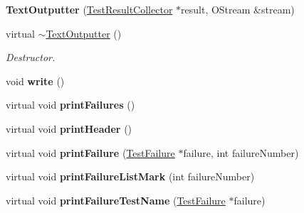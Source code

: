 \begin{DoxyCompactItemize}
\item 
\hypertarget{class_text_outputter_acd0d43125aaa9a929399fc9175633c78}{{\bfseries Text\+Outputter} (\hyperlink{class_test_result_collector}{Test\+Result\+Collector} $\ast$result, O\+Stream \&stream)}\label{class_text_outputter_acd0d43125aaa9a929399fc9175633c78}

\item 
\hypertarget{class_text_outputter_a835773bfd9dd781c3584886b37b30f92}{virtual \hyperlink{class_text_outputter_a835773bfd9dd781c3584886b37b30f92}{$\sim$\+Text\+Outputter} ()}\label{class_text_outputter_a835773bfd9dd781c3584886b37b30f92}

\begin{DoxyCompactList}\small\item\em Destructor. \end{DoxyCompactList}\item 
\hypertarget{class_text_outputter_a6b52425e9d17a04f04fc42a88b564176}{void {\bfseries write} ()}\label{class_text_outputter_a6b52425e9d17a04f04fc42a88b564176}

\item 
\hypertarget{class_text_outputter_aef9e8da525dc37c91e05ba9c51569260}{virtual void {\bfseries print\+Failures} ()}\label{class_text_outputter_aef9e8da525dc37c91e05ba9c51569260}

\item 
\hypertarget{class_text_outputter_ab14d6e5f16e1bdc995061ab5137d3671}{virtual void {\bfseries print\+Header} ()}\label{class_text_outputter_ab14d6e5f16e1bdc995061ab5137d3671}

\item 
\hypertarget{class_text_outputter_a943eb42337d075c43e1910092903cfbc}{virtual void {\bfseries print\+Failure} (\hyperlink{class_test_failure}{Test\+Failure} $\ast$failure, int failure\+Number)}\label{class_text_outputter_a943eb42337d075c43e1910092903cfbc}

\item 
\hypertarget{class_text_outputter_a347fd525f3318b45c691ef91fffa898e}{virtual void {\bfseries print\+Failure\+List\+Mark} (int failure\+Number)}\label{class_text_outputter_a347fd525f3318b45c691ef91fffa898e}

\item 
\hypertarget{class_text_outputter_a3fe4bbd729d08a2c35cf0a55cf81b72f}{virtual void {\bfseries print\+Failure\+Test\+Name} (\hyperlink{class_test_failure}{Test\+Failure} $\ast$failure)}\label{class_text_outputter_a3fe4bbd729d08a2c35cf0a55cf81b72f}


\end{DoxyCompactItemize}

